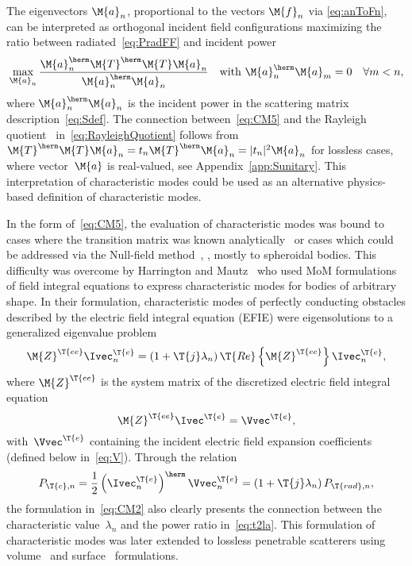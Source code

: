 \documentclass[journal]{IEEEtran}
\providecommand{\Ie}{\Ivec^{\T{e}}} %
\providecommand{\Ve}{\Vvec^{\T{e}}} %
\begin{document}
The eigenvectors $\M{a}_n$, proportional to the vectors $\M{f}_n$ via \eqref{eq:anToFn}, can be interpreted as orthogonal incident field configurations maximizing the ratio between radiated~\eqref{eq:PradFF} and incident power
\begin{equation}
	\max_{\M{a}_n} \frac{\M{a}_n^{\herm}\M{T}^{\herm}\M{T}\M{a}_n}{\M{a}_n^{\herm}\M{a}_n}
	\quad\text{with } \M{a}_n^{\herm}\M{a}_m=0
	\quad\forall m< n,
\label{eq:RayleighQuotient}
\end{equation}  
where $\M{a}_n^{\herm}\M{a}_n$ is the incident power in the scattering matrix description~\eqref{eq:Sdef}. 
The connection between~\eqref{eq:CM5} and the Rayleigh quotient~\cite{HornJohnson_MatrixAnalysis} in~\eqref{eq:RayleighQuotient} follows from $\M{T}^{\herm}\M{T}\M{a}_n=t_n\M{T}^{\herm}\M{a}_n=|t_n|^2\M{a}_n$ for lossless cases, where vector~$\M{a}$ is real-valued, see Appendix~\ref{app:Sunitary}. This interpretation of characteristic modes could be used as an alternative physics-based definition of characteristic modes. 

In the form of~\eqref{eq:CM5}, the evaluation of characteristic modes was bound to cases where the transition matrix was known analytically~\cite{Garbacz_TCMdissertation} or cases which could be addressed via the Null-field method~\cite{Waterman1965,Kristensson_ScatteringBook}, \ie{}, mostly to spheroidal bodies. This difficulty was overcome by Harrington and Mautz~\cite{HarringtonMautz_TheoryOfCharacteristicModesForConductingBodies,HarringtonMautz_ComputationOfCharacteristicModesForConductingBodies} who used \ac{MoM} formulations of field integral equations to express characteristic modes for bodies of arbitrary shape. In their formulation, characteristic modes of perfectly conducting obstacles described by the electric field integral equation (EFIE) were eigensolutions to a generalized eigenvalue problem
\begin{equation}
    \label{eq:CM2}
    \M{Z}^\T{ee}\Ie_n = \left(1 + \T{j}\lambda_n \right) \T{Re} \left\{ \M{Z}^\T{ee} \right\} \Ie_n,
\end{equation}
where $\M{Z}^\T{ee}$ is the system matrix of the discretized electric field integral equation~\cite{Harrington_FieldComputationByMoM}
\begin{equation}
    \label{eq:MoM}
    \M{Z}^\T{ee} \Ie = \Ve,
\end{equation}
with~$\Ve$ containing the incident electric field expansion coefficients (defined below in~\eqref{eq:V}).  Through the relation 
\begin{equation}
P_{\T{c},n} = \frac{1}{2}\left(\Ie_n\right)^\herm \Ve_n  = \left(1+ \T{j} \lambda_n \right)P_{\T{rad},n},
\end{equation}
the formulation in~\eqref{eq:CM2} also clearly presents the connection between the characteristic value~$\lambda_n$ and the power ratio in~\eqref{eq:t2la}. This formulation of characteristic modes was later extended to lossless penetrable scatterers using volume~\cite{HarringtonMautzChang_CharacteristicModesForDielectricAndMagneticBodies} and surface~\cite{ChangHarrington_AsurfaceFormulationForCharacteristicModesOfMaterialBodies} formulations. 
\end{document}
